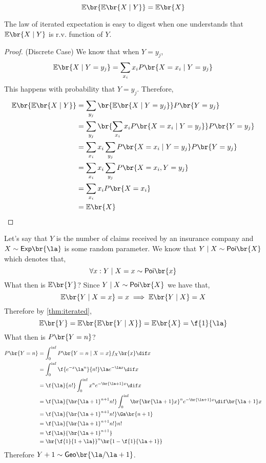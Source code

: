 \documentclass{article}
\newcommand{\Exp}{\mathbb{E}}
\newcommand{\Poi}{\mathsf{Poi}}
\newcommand{\Ex}{\mathsf{Exp}}
\newcommand{\Geo}{\mathsf{Geo}}
\begin{document}
\begin{theorem}
    \label{thm:iterated}
    \[ \Exp\br{\Exp\br{X \mid Y}} = \Exp\br{X} \]
\end{theorem}

The law of iterated expectation is easy to digest when one understands that $\Exp\br{X \mid Y}$ is r.v. function of $Y$.
\begin{proof}
    (Discrete Case) We know that when $Y=y_j$,
    \begin{align*}
    \Exp\br{X \mid Y=y_j}
    &=\sum_{x_i} x_i P\br{X = x_i \mid Y=y_j} \\
    \end{align*}
    This happens with probability that $Y=y_j$. Therefore,
    \begin{align*}
        \Exp\br{\Exp\br{X \mid Y}}
        &= \sum_{y_j} \br{\Exp\br{X \mid Y = y_j}} P\br{Y = y_j} \\
        &= \sum_{y_j} \br{\sum_{x_i} x_i P\br{X = x_i \mid Y=y_j}} P\br{Y = y_j} \\
        &= \sum_{x_i} x_i \sum_{y_j} P\br{X = x_i \mid Y=y_j} P\br{Y = y_j} \\
        &= \sum_{x_i} x_i \sum_{y_j} P\br{X = x_i, Y=y_j} \\
        &= \sum_{x_i} x_i P\br{X = x_i} \\
        &= \Exp\br{X}
    \end{align*}
\end{proof}

\begin{example}
    Let's say that $Y$ is the number of claims received by an insurance company and $X \sim \Ex\br{\la}$ is some random parameter. We know that $Y \mid X \sim \Poi\br{X}$ which denotes that,
    \[ \forall x : Y \mid X=x \sim \Poi\br{x} \]
    What then is $\Exp\br{Y}$? Since $Y \mid X \sim \Poi\br{X}$ we have that,
    \[ \Exp\br{Y \mid X =x} = x \implies \Exp\br{Y \mid X} = X \]
    Therefore by \cref{thm:iterated},
    \[ \Exp\br{Y} = \Exp\br{\Exp\br{Y\mid X}} = \Exp\br{X} = \f{1}{\la} \]
    What then is $P\br{Y = n}$?
    \begin{align*}
        P\br{Y = n}
        &= \int_{0}^{\inf}  P\br{Y = n \mid X = x} f_{X}\br{x} \dif x \\
        &= \int_{0}^{\inf}  \f{e^{-x}\la^n}{n!} \la e^{-\la x} \dif x \\
        &= \f{\la}{n!} \int_{0}^{\inf} x^n e^{-\br{\la + 1} x} \dif x \\
        &= \f{\la}{\br{\la+1}^{n+1}n!} \int_{0}^{\inf} \br{\br{\la+1} x}^{n} e^{-\br{\la + 1} x} \dif \br{\la + 1}x \\
        &= \f{\la}{\br{\la+1}^{n+1}n!} \Ga \br{n+1} \\
        &= \f{\la}{\br{\la+1}^{n+1}n!}n! \\
        &= \f{\la}{\br{\la+1}^{n+1}} \\
        &= \br{\f{1}{1 + \la}}^n \br{1 - \f{1}{\la + 1}}
    \end{align*}
    Therefore $Y+1 \sim \Geo\br{\la / \la +1}$.
\end{example}
\end{document}
